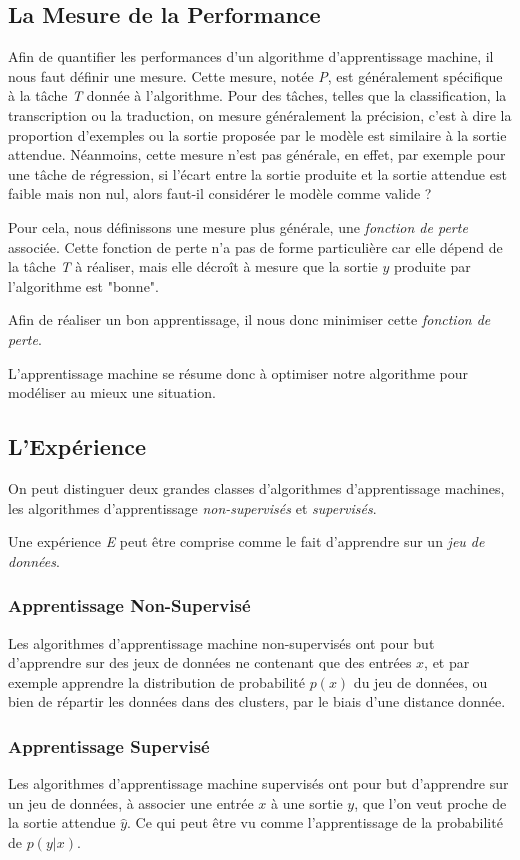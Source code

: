 \documentclass[a4paper, 11pt]{report}
\begin{document}
\subsection{La Mesure de la Performance}
Afin de quantifier les performances d'un algorithme d'apprentissage machine, il nous faut définir une mesure. Cette mesure, notée \emph{P}, est généralement spécifique à la tâche \emph{T} donnée à l'algorithme.
Pour des tâches, telles que la classification, la transcription ou la traduction, on mesure généralement la précision, c'est à dire la proportion d'exemples ou la sortie proposée par le modèle est similaire à la sortie attendue.
Néanmoins, cette mesure n'est pas générale, en effet, par exemple pour une tâche de régression, si l'écart entre la sortie produite et la sortie attendue est faible mais non nul, alors faut-il considérer le modèle comme valide ?

Pour cela, nous définissons une mesure plus générale, une \emph{fonction de perte }associée.
Cette fonction de perte n'a pas de forme particulière car elle dépend de la tâche \emph{T} à réaliser, mais elle décroît à mesure que la sortie $y$ produite par l'algorithme est "bonne".

Afin de réaliser un bon apprentissage, il nous donc minimiser cette \emph{fonction de perte}.

L'apprentissage machine se résume donc à optimiser notre algorithme pour modéliser au mieux une situation.
		
\subsection{L'Expérience}
On peut distinguer deux grandes classes d'algorithmes d'apprentissage machines, les algorithmes d'apprentissage \emph{non-supervisés} et \emph{supervisés}.

Une expérience \emph{E} peut être comprise comme le fait d'apprendre sur un \emph{jeu de données}.
\subsubsection{Apprentissage Non-Supervisé}
Les algorithmes d'apprentissage machine non-supervisés ont pour but d'apprendre sur des jeux de données ne contenant que des entrées $x$, et par exemple apprendre la distribution de probabilité $p(x)$ du jeu de données, ou bien de répartir les données dans des clusters, par le biais d'une distance donnée.
\subsubsection{Apprentissage Supervisé}
Les algorithmes d'apprentissage machine supervisés ont pour but d'apprendre sur un jeu de données, à associer une entrée $x$ à une sortie $y$, que l'on veut proche de la sortie attendue $\hat{y}$. Ce qui peut être vu comme l'apprentissage de la probabilité de $p(y|x)$.
	
\end{document}
